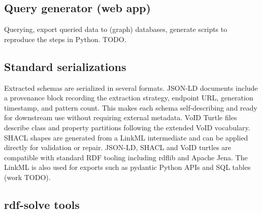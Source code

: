 \documentclass[12pt]{article}
\begin{document}
\subsection{Query generator (web app)}
Querying, export queried data to (graph) databases, generate scripts to reproduce the steps in Python. TODO.    %

\subsection{Standard serializations}

Extracted schemas are serialized in several formats. JSON-LD documents include a provenance
block recording the extraction strategy, endpoint URL, generation timestamp, and pattern
count. This makes each schema self-describing and ready for downstream use without requiring
external metadata. VoID Turtle files describe class and property partitions following the
extended VoID vocabulary. SHACL shapes are generated from a LinkML intermediate and can be
applied directly for validation or repair. JSON-LD, SHACL and VoID turtles are compatible with
standard RDF tooling including rdflib and Apache Jena. The LinkML is also used for exports such
as pydantic Python APIs and SQL tables (work TODO).

\subsection{rdf-solve tools}  %
\end{document}
